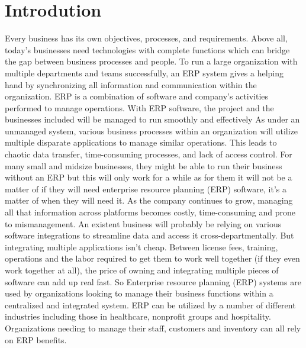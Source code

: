 \chapter{Introdution}
Every business has its own objectives, processes, and requirements. Above all, today’s 
businesses need technologies with complete functions which can bridge the gap between business 
processes and people. To run a large organization with multiple departments and teams successfully, 
an ERP system gives a helping hand by synchronizing all information and communication within the organization. 
ERP is a combination of software and company’s activities performed to manage operations. With ERP software, 
the project and the businesses included will be managed to run smoothly and effectively \newline \newline
As under an unmanaged system, various business processes within an organization will utilize multiple disparate 
applications to manage similar operations. This leads to chaotic data transfer, time-consuming processes, and 
lack of access control. \newline \newline
For many small and midsize businesses, they might be able to run their business without an ERP but this will only work 
for a while as for them it will not be a matter of if they will need enterprise resource 
planning (ERP) software, it’s a matter of when they will need it. As the company continues to grow, 
managing all that information across platforms becomes costly, time-consuming and prone to mismanagement.
\newline \newline
An existent business will probably be relying on various software integrations to streamline data and access it cross-departmentally. 
But integrating multiple applications isn’t cheap. 
Between license fees, training, operations and the labor required to get them to work well 
together (if they even work together at all), the price of owning and integrating multiple pieces of 
software can add up real fast. \newline \newline
So Enterprise resource planning (ERP) systems are used by organizations looking to manage 
their business functions within a centralized and integrated system. ERP can be utilized by a number of different industries including those in 
healthcare, nonprofit groups and hospitality. Organizations needing to manage their 
staff, customers and inventory can all rely on ERP benefits.\\\\
